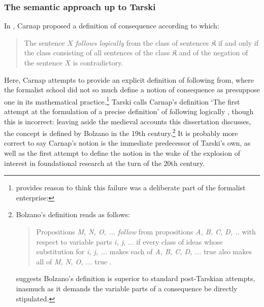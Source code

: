 	\subsubsection{The semantic approach up to Tarski}
	In \cite{Carnap1934}, Carnap proposed a definition of consequence according to which: 
	\begin{quote}The sentence $X$ \textit{follows logically} from the class of sentences $\mathfrak{K}$ if and only if the class consisting of all sentences of the class $\mathfrak{K}$ and of the negation of the sentence $X$ is contradictory.\end{quote}
	
	Here, Carnap attempts to provide an explicit definition of following from, where the formalist school did not so much define a notion of consequence as presuppose one in its mathematical practice.\footnote{\cite[15]{Hardy1929} provides reason to think this failure was a deliberate part of the formalist enterprise: } Tarski calls Carnap's definition `The first attempt at the formulation of a precise definition' of following logically \cite[182]{Tarski2002}, though this is incorrect: leaving aside the medieval accounts this dissertation discusses, the concept is defined by Bolzano in the 19th century.\footnote{Bolzano's definition reads as follows: \begin{quote}Propositions \textit{M, N, O, ... follow} from propositions \textit{A, B, C, D, ..} with respect to variable parts \textit{i, j,} ... if every class of ideas whose substitution for \textit{i, j, ...} makes each of \textit{A, B, C, D, ...} true also makes all of \textit{M, N, O, ...} true \cite[209]{Bolzano1972}.\end{quote} \cite{George1986} suggests Bolzano's definition is superior to standard post-Tarskian attempts, inasmuch as it demands the variable parts of a consequence be directly stipulated.} It is probably more correct to say Carnap's notion is the immediate predecessor of Tarski's own, as well as the first attempt to define the notion in the wake of the explosion of interest in foundational research at the turn of the 20th century.
	
